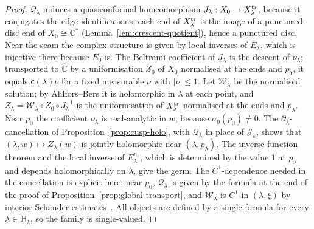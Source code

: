 \documentclass[11pt]{amsart}
\theoremstyle{definition}
\begin{document}
\begin{proof}
$\mathcal Q_\lambda$ induces a quasiconformal homeomorphism $J_\lambda:X_0\to X^{\rm tr}_\lambda$,
because it conjugates the edge identifications; each end of $X^{\rm tr}_\lambda$ is
the image of a punctured-disc end of $X_0\cong\mathbb C^*$
(Lemma~\ref{lem:crescent-quotient}), hence a punctured disc.  Near the seam
the complex structure is given by local inverses of $E_\lambda$, which is
injective there because $E_0$ is.  The Beltrami coefficient of $J_\lambda$ is the
descent of $\nu_\lambda$; transported to $\hat{\mathbb C}$ by a uniformisation $Z_0$ of $X_0$
normalised at the ends and $p_0$, it equals $\mathsf c(\lambda)\nu$ for a fixed measurable
$\nu$ with $|\nu|\le1$.  Let $\mathcal W_\lambda$ be the normalised solution; by Ahlfors--Bers
it is holomorphic in $\lambda$ at each point, and $Z_\lambda=\mathcal W_\lambda\circ Z_0\circ J_\lambda^{-1}$ is the
uniformisation of $X^{\rm tr}_\lambda$ normalised at the ends and $p_\lambda$.  Near $p_0$ the
coefficient $\nu_\lambda$ is real-analytic in $w$, because $\sigma_0(p_0)\ne0$.  The
$\partial_{\bar\lambda}$-cancellation of Proposition~\ref{prop:cusp-holo}, with $\mathcal Q_\lambda$ in place
of $\mathcal J_\varepsilon$, shows that $(\lambda,w)\mapsto Z_\lambda(w)$ is jointly holomorphic near
$(\lambda,p_\lambda)$.  The inverse function theorem and the local inverse of $E_\lambda^{n_0}$,
which is determined by the value $1$ at $p_\lambda$ and depends holomorphically on
$\lambda$, give the germ.  The $C^1$-dependence needed in the cancellation is
explicit here: near $p_0$, $\mathcal Q_\lambda$ is given by the formula at the end of the
proof of Proposition~\ref{prop:global-transport}, and $\mathcal W_\lambda$ is $C^1$ in
$(\lambda,\xi)$ by interior Schauder estimates~\cite[Ch.~V]{AhlforsLectures}.  All
objects are defined by a single formula for every $\lambda\in\mathbb H_\lambda$, so the family
is single-valued.
\end{proof}
\end{document}
